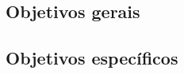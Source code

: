 \subsection{Objetivos gerais}
\label{objetivos-gerais}





\subsection{Objetivos específicos}
\label{objetivos-especificos}